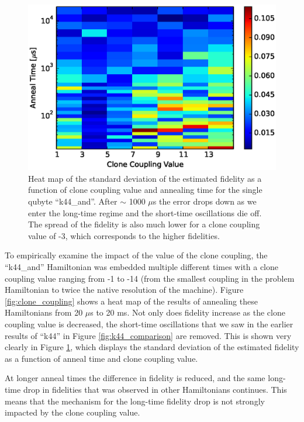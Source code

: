 \begin{figure}
	\includegraphics{img/t_c.eps}
	\caption[Fidelity Standard Deviation]{Heat map of the standard deviation of the estimated fidelity as a function of clone coupling value and annealing time for the single qubyte ``k44\_and''.  After $\sim$ 1000 $\mu$s the error drops down as we enter the long-time regime and the short-time oscillations die off.  The spread of the fidelity is also much lower for a clone coupling value of -3, which corresponds to the higher fidelities.}
	\label{fig:std_time}
\end{figure}

To empirically examine the impact of the value of the clone coupling, the ``k44\_and'' Hamiltonian was embedded multiple different times with a clone coupling value ranging from -1 to -14 (from the smallest coupling in the problem Hamiltonian to twice the native resolution of the machine).  Figure \ref{fig:clone_coupling} shows a heat map of the results of annealing these Hamiltonians from 20 $\mu$s to 20 ms.  Not only does fidelity increase as the clone coupling value is decreased, the short-time oscillations that we saw in the earlier results of ``k44'' in Figure \ref{fig:k44_comparison} are removed.  This is shown very clearly in Figure \ref{fig:std_time}, which displays the standard deviation of the estimated fidelity as a function of anneal time and clone coupling value.

At longer anneal times the difference in fidelity is reduced, and the same long-time drop in fidelities that was observed in other Hamiltonians continues.  This means that the mechanism for the long-time fidelity drop is not strongly impacted by the clone coupling value.

